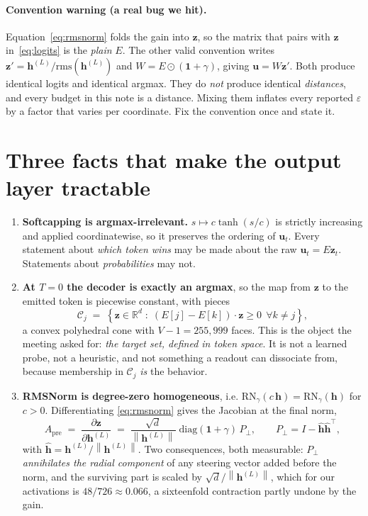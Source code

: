 \documentclass[11pt]{article}
\newcommand{\R}{\mathbb{R}}
\newcommand{\vh}{\bm{h}}
\newcommand{\vz}{\bm{z}}
\newcommand{\norm}[1]{\left\lVert #1 \right\rVert}
\begin{document}
\paragraph{Convention warning (a real bug we hit).}
Equation~\eqref{eq:rmsnorm} folds the gain into $\vz$, so the matrix that pairs with
$\vz$ in~\eqref{eq:logits} is the \emph{plain} $E$. The other valid convention writes
$\vz' = \vh^{(L)}/\mathrm{rms}(\vh^{(L)})$ and $W = E \odot (\bm{1}+\gamma)$, giving
$\bm{u} = W \vz'$. Both produce identical logits and identical argmax. They do
\emph{not} produce identical \emph{distances}, and every budget in this note is a
distance. Mixing them inflates every reported $\varepsilon$ by a factor that varies
per coordinate. Fix the convention once and state it.

\section{Three facts that make the output layer tractable}

\begin{enumerate}
\item \textbf{Softcapping is argmax-irrelevant.} $s \mapsto c\tanh(s/c)$ is strictly
increasing and applied coordinatewise, so it preserves the ordering of
$\bm{u}_t$. Every statement about \emph{which token wins} may be made about the raw
$\bm{u}_t = E\vz_t$. Statements about \emph{probabilities} may not.

\item \textbf{At $T = 0$ the decoder is exactly an argmax}, so the map from $\vz$ to
the emitted token is piecewise constant, with pieces
\begin{equation}
  \mathcal{C}_j \;=\; \left\{ \vz \in \R^d \;:\;
    (E[j] - E[k]) \cdot \vz \ge 0 \ \ \forall k \ne j \right\},
  \label{eq:cone}
\end{equation}
a convex polyhedral cone with $V - 1 = 255{,}999$ faces. This is the object the
meeting asked for: \emph{the target set, defined in token space}. It is not a
learned probe, not a heuristic, and not something a readout can dissociate from,
because membership in $\mathcal{C}_j$ \emph{is} the behavior.

\item \textbf{RMSNorm is degree-zero homogeneous}, i.e.
$\mathrm{RN}_\gamma(c\,\vh) = \mathrm{RN}_\gamma(\vh)$ for $c > 0$. Differentiating
\eqref{eq:rmsnorm} gives the Jacobian at the final norm,
\begin{equation}
  A_{\mathrm{pre}} \;=\; \frac{\partial \vz}{\partial \vh^{(L)}}
  \;=\; \frac{\sqrt{d}}{\norm{\vh^{(L)}}}\;
        \mathrm{diag}(\bm{1}+\gamma)\, P_\perp,
  \qquad P_\perp = I - \hat{\vh}\hat{\vh}^{\!\top},
  \label{eq:rmsjac}
\end{equation}
with $\hat{\vh} = \vh^{(L)}/\norm{\vh^{(L)}}$. Two consequences, both measurable:
$P_\perp$ \emph{annihilates the radial component} of any steering vector added before
the norm, and the surviving part is scaled by $\sqrt{d}/\norm{\vh^{(L)}}$, which for
our activations is $48/726 \approx 0.066$, a sixteenfold contraction partly undone by
the gain.
\end{enumerate}
\end{document}
